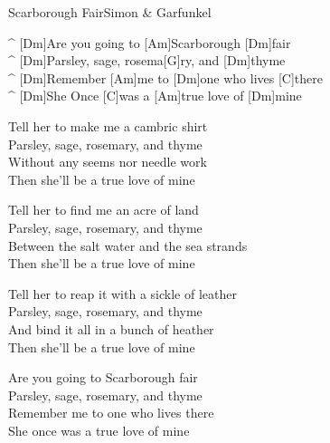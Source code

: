 \begin{song}{Scarborough Fair}{Simon \& Garfunkel}

\begin{guitar}
^ [Dm]Are you going to [Am]Scarborough [Dm]fair\\
^ [Dm]Parsley, sage, rosema[G]ry, and [Dm]thyme\\
^ [Dm]Remember [Am]me to [Dm]one who lives [C]there\\
^ [Dm]She Once [C]was a [Am]true love of [Dm]mine\\
\end{guitar}

\begin{guitar}
Tell her to make me a cambric shirt\\
Parsley, sage, rosemary, and thyme\\
Without any seems nor needle work\\
Then she'll be a true love of mine\\
\end{guitar}


\begin{guitar}
Tell her to find me an acre of land\\
Parsley, sage, rosemary, and thyme\\
Between the salt water and the sea strands\\
Then she'll be a true love of mine\\
\end{guitar}


\begin{guitar}
Tell her to reap it with a sickle of leather\\
Parsley, sage, rosemary, and thyme\\
And bind it all in a bunch of heather\\
Then she'll be a true love of mine\\
\end{guitar}

\begin{guitar}
Are you going to Scarborough fair\\
Parsley, sage, rosemary, and thyme\\
Remember me to one who lives there\\
She once was a true love of mine\\
\end{guitar}

\end{song}
